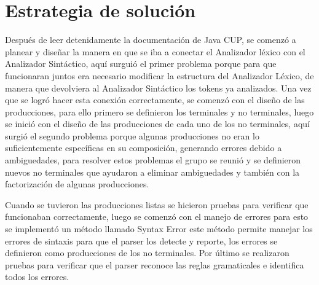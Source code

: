 \documentclass[a4paper,12pt]{article}
\begin{document}
\section*{Estrategia de solución}
\begin{flushleft}
    \hspace*{2em} Después de leer detenidamente la documentación 
    de Java CUP, se comenzó a planear y diseñar la manera en que se iba a conectar el Analizador léxico con el Analizador Sintáctico, 
    aquí surguió el primer problema porque para que funcionaran juntos era necesario modificar la estructura del Analizador Léxico, 
    de manera que devolviera al Analizador Sintáctico los tokens ya analizados. Una vez que se logró hacer esta conexión correctamente, 
    se comenzó con el diseño de las producciones, para ello primero se definieron los terminales y no terminales, luego se inició con el diseño de las 
    producciones de cada uno de los no terminales, aquí surgió el segundo problema porque algunas producciones no eran lo suficientemente 
    específicas en su composición, generando errores debido a ambiguedades, para resolver estos problemas el grupo se reunió y se definieron 
    nuevos no terminales que ayudaron a eliminar ambiguedades y también con la factorización de algunas producciones. \par
   \vspace{1em}
    \hspace*{2em} Cuando se tuvieron las producciones listas se hicieron pruebas para verificar que funcionaban correctamente, 
    luego se comenzó con el manejo de errores para esto se implementó un método llamado Syntax Error este método permite 
    manejar los errores de sintaxis para que el parser los detecte y reporte, los errores se definieron como producciones de los 
   no terminales. Por último se realizaron pruebas para verificar que el parser reconoce las reglas gramaticales e identifica todos los errores. \par
    \vspace{1em}
\end{flushleft}

\newpage

\end{document}
